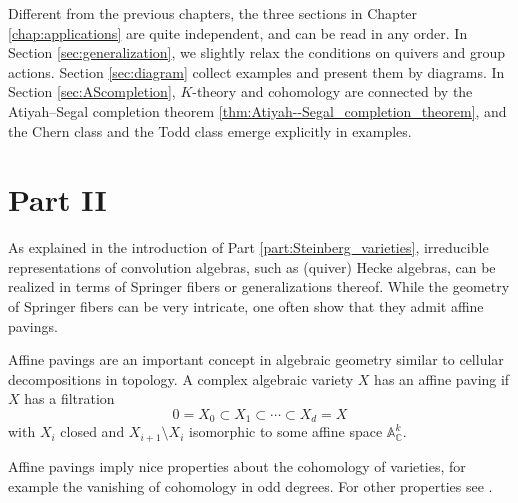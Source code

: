 Different from the previous chapters, the three sections in Chapter \ref{chap:applications} are quite independent, and can be read in any order. In Section \ref{sec:generalization}, we slightly relax the conditions on quivers and group actions. Section \ref{sec:diagram} collect examples and present them by diagrams. In Section \ref{sec:AScompletion}, $K$-theory and cohomology are connected by the Atiyah--Segal completion theorem \ref{thm:Atiyah--Segal_completion_theorem}, and the Chern class and the Todd class emerge explicitly in examples.
\clearpage
\section*{Part II}


As explained in the introduction of Part \ref{part:Steinberg_varieties}, irreducible representations of convolution algebras, such as (quiver) Hecke algebras, can be realized in terms of Springer fibers or generalizations thereof.
While the geometry of Springer fibers can be very intricate, one often show that they admit affine pavings.

Affine pavings are an important concept in algebraic geometry similar to cellular decompositions in topology. A complex algebraic variety $X$ has an affine paving if $X$ has a filtration
$$0= X_0 \subset X_1 \subset \cdots \subset X_d=X$$
with $X_i$ closed and $X_{i+1} \setminus X_i$ isomorphic to some affine space $\mathbb{A}^k_{\mathbb{C}}$.

Affine pavings imply nice properties about the cohomology of varieties, for example the vanishing of cohomology in odd degrees. For other properties see \cite[1.7]{de1988homology}.

